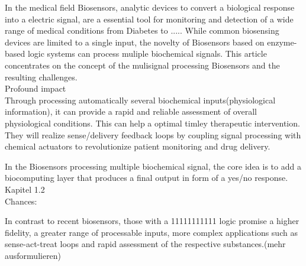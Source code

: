 \documentclass[runningheads]{llncs}
\begin{document}
	
	In the medical field Biosensors, analytic devices to convert a biological response into a electric signal, are a essential tool for monitoring and detection of a wide range of medical conditions from Diabetes to .....
	While common biosensing devices are limited to a single input, the novelty of Biosensors based on enzyme-based logic systems can process muliple biochemical signals. This article concentrates on the concept of the mulisignal processing Biosensors and the resulting challenges.\\
	
	Profound impact\\
	
	Through processing automatically several biochemical inputs(physiological information), it can provide a rapid and reliable assessment of overall physiological conditions. This can help a optimal timley therapeutic intervention. They will realize sense/delivery feedback loops by coupling signal processing with chemical actuators to revolutionize patient monitoring and drug delivery. 
	
	In the Biosensors processing multiple biochemical signal, the core idea is to add a biocomputing layer that produces a final output in form of a yes/no response. Kapitel 1.2\\
	
	Chances:
	
	
	
	
	In contrast to recent biosensors, those with a 11111111111 logic promise a higher fidelity, a greater range of processable inputs, more complex applications such as sense-act-treat loops and rapid assessment of the respective substances.(mehr ausformulieren)
	
	
	
\end{document}
